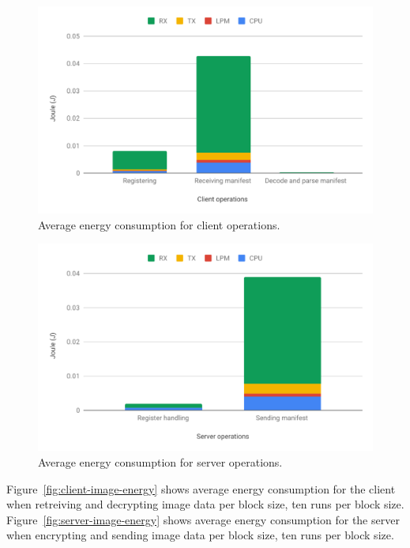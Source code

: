 \documentclass[0-thesis.tex]{subfiles}
\begin{document}
\begin{figure}
    \caption{Average energy consumption for client operations.}
    \label{fig:client-operations-energy}
    \includegraphics[scale=0.8]{images/client-operations-energy.pdf}
\end{figure}

\begin{figure}
    \caption{Average energy consumption for server operations.}
    \label{fig:server-operations-energy}
    \includegraphics[scale=0.8]{images/server-operations-energy.pdf}
\end{figure}

Figure~\ref{fig:client-image-energy} shows average energy consumption for the client when
retreiving and decrypting image data per block size, ten runs per block size.
Figure~\ref{fig:server-image-energy} shows average energy consumption for the server when
encrypting and sending image data per block size, ten runs per block size.
\end{document}
